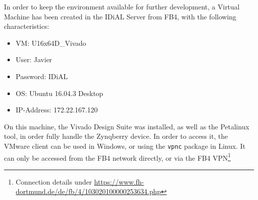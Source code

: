 In order to keep the environment available for further development, a Virtual Machine has been created in the IDiAL Server from FB4, with the following characteristics:

\begin{itemize}
	\item VM: U16x64D\_Vivado
	\item User: Javier
	\item Password: IDiAL
	\item OS: Ubuntu 16.04.3 Desktop
	\item IP-Address: 172.22.167.120
\end{itemize}

On this machine, the Vivado Design Suite was installed, as well as the Petalinux tool, in order fully handle the Zynqberry device. In order to access it, the VMware client can be used in Windows, or using the \texttt{vpnc} package in Linux. It can only be accessed from the FB4 network directly, or via the FB4 VPN\footnote{Connection details under \underline{https://www.fh-dortmund.de/de/fb/4/103020100000253634.php}}
